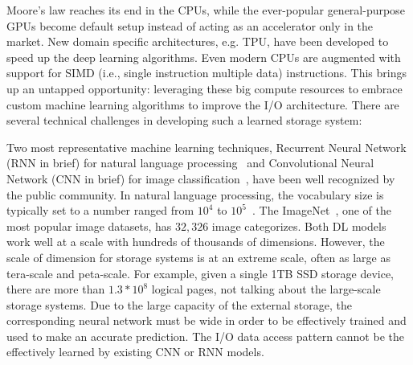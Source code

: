Moore's law reaches its end in the CPUs,
while the ever-popular general-purpose GPUs become default setup
instead of acting as an accelerator only in the market.
New domain specific architectures, e.g. TPU, have been developed to speed up the deep learning algorithms.
Even modern CPUs are augmented with support for SIMD (i.e., single instruction multiple data) instructions.
This brings up an untapped opportunity: leveraging these big compute resources
to embrace custom machine learning algorithms to improve the I/O architecture.
There are several technical challenges in developing such a learned storage system:

Two most representative machine learning techniques,
Recurrent Neural Network (RNN in brief) for natural language processing~\cite{graves2013generating,cho2014learning,li2015constructing}
and Convolutional Neural Network (CNN in brief) for image classification~\cite{lecun1995convolutional,karpathy2014large,kim2014convolutional,abdel2014convolutional,krizhevsky2012imagenet},
have been well recognized by the public community.
In natural language processing, the vocabulary size is
typically set to a number ranged from $10^4$ to $10^5$~\cite{Britz:2017}.
The ImageNet~\cite{deng2009imagenet}, one of the most popular image datasets, has $32,326$ image categorizes.
Both DL models work well at a scale with hundreds of thousands of dimensions.
However, the scale of dimension for storage systems is at an extreme scale,
often as large as tera-scale and peta-scale.
For example, given a single 1TB SSD storage device,
there are more than $1.3*10^8$ logical pages,
not talking about the large-scale storage systems.
Due to the large capacity of the external storage,
the corresponding neural network must be wide in order to be effectively trained
and used to make an accurate prediction.
The I/O data access pattern cannot be the effectively learned
by existing CNN or RNN models.